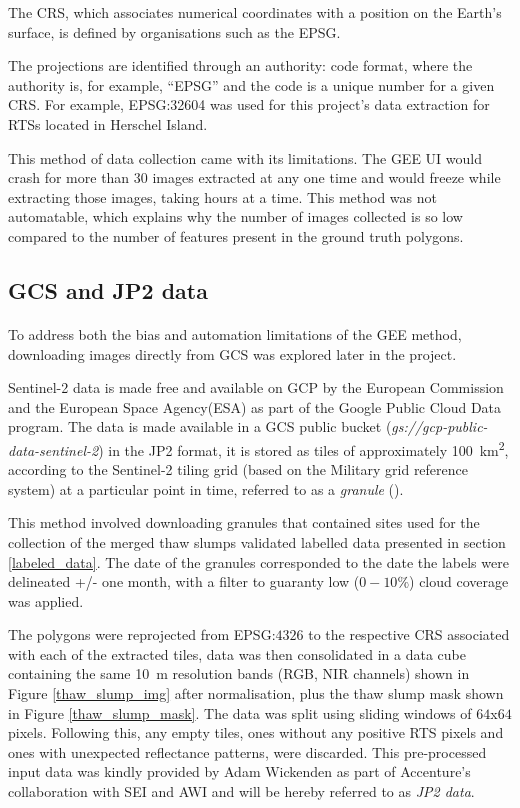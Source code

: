 The \gls{CRS}, which associates numerical coordinates with a position on the Earth's surface, is defined by organisations such as the \gls{EPSG}.

The projections are identified through an authority: code format, where the authority is, for example, “\gls{EPSG}” and the code is a unique number for a given \gls{CRS}. For example, \gls{EPSG}:32604 was used for this project's data extraction for \gls{RTS}s located in Herschel Island.

This method of data collection came with its limitations. The \gls{GEE} \gls{UI} would crash for more than 30 images extracted at any one time and would freeze while extracting those images, taking hours at a time. This method was not automatable, which explains why the number of images collected is so low compared to the number of features present in the ground truth polygons.

\subsection{\gls{GCS} and \gls{JP2} data}
\paragraph{}
To address both the bias and automation limitations of the \gls{GEE} method, downloading images directly from \gls{GCS} was explored later in the project.

Sentinel-2 data is made free and available on \gls{GCP} by the European Commission and the European Space Agency(ESA) as part of the Google Public Cloud Data program. The data is made available in a \gls{GCS} public bucket (\textit{gs://gcp-public-data-sentinel-2}) in the \gls{JP2} format, it is stored as tiles of approximately \SI{100}{\kilo\metre\squared}, according to the Sentinel-2 tiling grid (based on the Military grid reference system) at a particular point in time, referred to as a \textit{granule} (\cite{sentinel2_gcp}).

This method involved downloading granules that contained sites used for the collection of the merged thaw slumps validated labelled data presented in section \ref{labeled_data}. The date of the granules corresponded to the date the labels were delineated +/- one month, with a filter to guaranty low ($0-10\%$) cloud coverage was applied.

The polygons were reprojected from \gls{EPSG}:$4326$ to the respective \gls{CRS} associated with each of the extracted tiles, data was then consolidated in a data cube containing the same \SI{10}{\metre} resolution bands (\gls{RGB}, \gls{NIR} channels) shown in Figure \ref{thaw_slump_img} after normalisation, plus the thaw slump mask shown in Figure \ref{thaw_slump_mask}. The data was split using sliding windows of $64$x$64$ pixels. Following this, any empty tiles, ones without any positive \gls{RTS} pixels and ones with unexpected reflectance patterns, were discarded. This pre-processed input data was kindly provided by Adam Wickenden as part of Accenture's collaboration with \gls{SEI} and \gls{AWI} and will be hereby referred to as \textit{\gls{JP2} data}.

